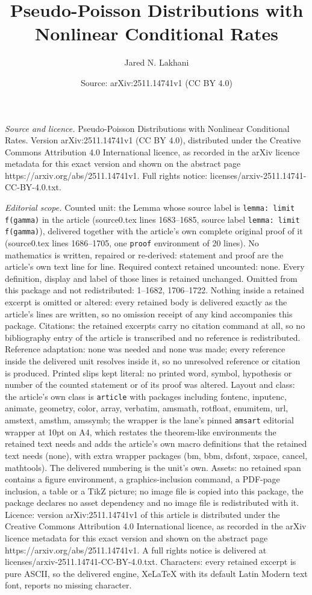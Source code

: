 \documentclass[10pt,a4paper]{amsart}
\title[Pseudo-Poisson Distributions with Nonlinear Conditional Rate]{Pseudo-Poisson Distributions with Nonlinear Conditional Rates}
\author{Jared N. Lakhani}
\date{Source: arXiv:2511.14741v1 (CC BY 4.0)}
\begin{document}
\maketitle

\noindent\emph{Source and licence.} Pseudo-Poisson Distributions with Nonlinear Conditional Rates. Version arXiv:2511.14741v1 (CC BY 4.0), distributed under the Creative Commons Attribution 4.0 International licence, as recorded in the arXiv licence metadata for this exact version and shown on the abstract page https://arxiv.org/abs/2511.14741v1. Full rights notice: licenses/arxiv-2511.14741-CC-BY-4.0.txt.\par\smallskip

\noindent\textit{Editorial scope.} Counted unit: the Lemma whose source label is \texttt{lemma: limit f(gamma)} in the article (source0.tex lines 1683--1685, source label \texttt{lemma: limit f(gamma)}), delivered together with the article's own complete original proof of it (source0.tex lines 1686--1705, one \texttt{proof} environment of 20 lines). No mathematics is written, repaired or re-derived: statement and proof are the article's own text line for line. Required context retained uncounted: none. Every definition, display and label of those lines is retained unchanged. Omitted from this package and not redistributed: 1--1682, 1706--1722. Nothing inside a retained excerpt is omitted or altered: every retained body is delivered exactly as the article's lines are written, so no omission receipt of any kind accompanies this package. Citations: the retained excerpts carry no citation command at all, so no bibliography entry of the article is transcribed and no reference is redistributed. Reference adaptation: none was needed and none was made; every reference inside the delivered unit resolves inside it, so no unresolved reference or citation is produced. Printed slips kept literal: no printed word, symbol, hypothesis or number of the counted statement or of its proof was altered. Layout and class: the article's own class is \texttt{article} with packages including fontenc, inputenc, animate, geometry, color, array, verbatim, amsmath, rotfloat, enumitem, url, amstext, amsthm, amssymb; the wrapper is the lane's pinned \texttt{amsart} editorial wrapper at 10pt on A4, which restates the theorem-like environments the retained text needs and adds the article's own macro definitions that the retained text needs (none), with extra wrapper packages (bm, bbm, dsfont, xspace, cancel, mathtools). The delivered numbering is the unit's own. Assets: no retained span contains a figure environment, a graphics-inclusion command, a PDF-page inclusion, a table or a TikZ picture; no image file is copied into this package, the package declares no asset dependency and no image file is redistributed with it. Licence: version arXiv:2511.14741v1 of this article is distributed under the Creative Commons Attribution 4.0 International licence, as recorded in the arXiv licence metadata for this exact version and shown on the abstract page https://arxiv.org/abs/2511.14741v1. A full rights notice is delivered at licenses/arxiv-2511.14741-CC-BY-4.0.txt. Characters: every retained excerpt is pure ASCII, so the delivered engine, XeLaTeX with its default Latin Modern text font, reports no missing character.
\end{document}
